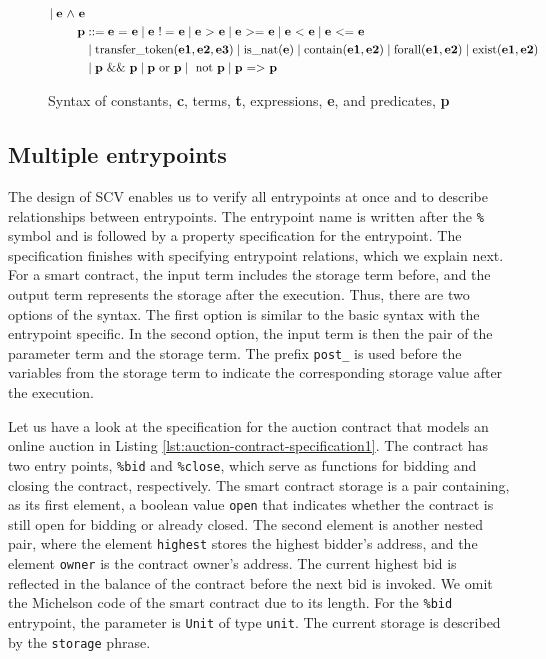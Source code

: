 \documentclass[runningheads]{llncs}
\begin{document}
\begin{figure}[tp]
\begin{align*}
\mid \textbf{e} \text{ $\wedge$ } \textbf{e}  \\
\textbf{p} & :: = \textbf{e} \text{ = } \textbf{e}
\mid \textbf{e} \text{ $!=$ } \textbf{e}
\mid \textbf{e} \text{ $>$ } \textbf{e}
\mid \textbf{e} \text{ $>=$ } \textbf{e}
\mid \textbf{e} \text{ $<$ } \textbf{e}
\mid \textbf{e} \text{ $<=$ } \textbf{e} \\
& \mid \text{transfer\_token} (\textbf{e1}, \textbf{e2}, \textbf{e3})  
 \mid \text{is\_nat} (\textbf{e})  
 \mid \text{contain} (\textbf{e1}, \textbf{e2}) 
 \mid \text{forall} (\textbf{e1}, \textbf{e2})
\mid \text{exist} (\textbf{e1}, \textbf{e2}) \\
& \mid \textbf{p} \text{ \&\& } \textbf{p}\mid \textbf{p} \text{ or } \textbf{p}  
\mid  \text{ not } \textbf{p} \mid \textbf{p} \text{ $=>$ } \textbf{p} \\
\end{align*}
\caption{Syntax of constants, \textbf{c}, terms, \textbf{t}, expressions, \textbf{e}, and predicates, \textbf{p}}
\label{fig:syntax-terms-predicates}
\end{figure}
\subsection{Multiple entrypoints}
\label{sec:multiple-entrypoint}
The design of SCV enables us to verify all entrypoints
at once and to describe relationships between entrypoints. The entrypoint name is written after the \lstinline/%/ symbol and is followed by a property specification for the entrypoint.  The specification finishes with specifying entrypoint relations, which we explain next. For a smart contract, the input term includes the storage term before, and the output term represents the storage after the execution. Thus, there are two options of the syntax. The first option is similar to the basic syntax with the entrypoint specific.  
In the second option, the input term is then the pair of the parameter term and the storage term. The prefix \lstinline/post_/ is used before the variables from the storage term to indicate the corresponding storage value after the execution.

Let us have a look at the specification for the auction
contract that models an online auction in Listing \ref{lst:auction-contract-specification1}. The contract has two entry points, \lstinline|%bid| and \lstinline|%close|, which serve as functions for bidding and closing the contract, respectively. The smart contract storage is a pair containing, as its first element, a boolean value \lstinline|open| that indicates whether the contract is still open for bidding or already closed. The second element is another nested pair, where the element \lstinline|highest| stores the highest bidder's address, and the element \lstinline|owner| is the contract owner's address. The current highest bid is reflected in the balance of the contract before the next bid is invoked. We omit the Michelson code of the smart contract due to its length.  For the \lstinline/%bid/ entrypoint, the parameter is \lstinline/Unit/ of type \lstinline/unit/.
The current storage is described by the \lstinline|storage| phrase. 
\end{document}
